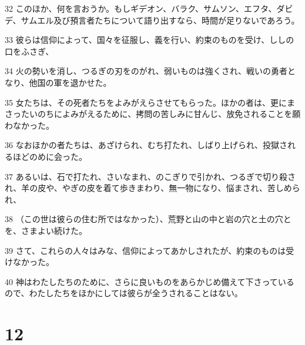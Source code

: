 \par 32 このほか、何を言おうか。もしギデオン、バラク、サムソン、エフタ、ダビデ、サムエル及び預言者たちについて語り出すなら、時間が足りないであろう。
\par 33 彼らは信仰によって、国々を征服し、義を行い、約束のものを受け、ししの口をふさぎ、
\par 34 火の勢いを消し、つるぎの刃をのがれ、弱いものは強くされ、戦いの勇者となり、他国の軍を退かせた。
\par 35 女たちは、その死者たちをよみがえらさせてもらった。ほかの者は、更にまさったいのちによみがえるために、拷問の苦しみに甘んじ、放免されることを願わなかった。
\par 36 なおほかの者たちは、あざけられ、むち打たれ、しばり上げられ、投獄されるほどのめに会った。
\par 37 あるいは、石で打たれ、さいなまれ、のこぎりで引かれ、つるぎで切り殺され、羊の皮や、やぎの皮を着て歩きまわり、無一物になり、悩まされ、苦しめられ、
\par 38 （この世は彼らの住む所ではなかった）、荒野と山の中と岩の穴と土の穴とを、さまよい続けた。
\par 39 さて、これらの人々はみな、信仰によってあかしされたが、約束のものは受けなかった。
\par 40 神はわたしたちのために、さらに良いものをあらかじめ備えて下さっているので、わたしたちをほかにしては彼らが全うされることはない。

\chapter{12}

